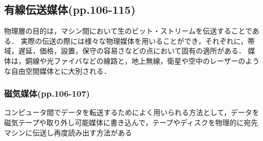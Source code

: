 \documentclass[a4paper]{ltjsarticle}
\begin{document}
  \subsection{有線伝送媒体(pp.106-115)}
    物理層の目的は，マシン間において生のビット・ストリームを伝送することである．
    実際の伝送の際には様々な物理媒体を用いることができ，それぞれに，帯域，遅延，価格，設置，保守の容易さなどの点において固有の適所がある．
    媒体は，銅線や光ファイバなどの線路と，地上無線，衛星や空中のレーザーのような自由空間媒体とに大別される．
    \subsubsection{磁気媒体(pp.106-107)}
			コンピュータ間でデータを転送するためによく用いられる方法として，データを磁気テープや取り外し可能媒体に書き込んで，テープやディスクを物理的に宛先マシンに伝送し再度読み出す方法がある
\end{document}
